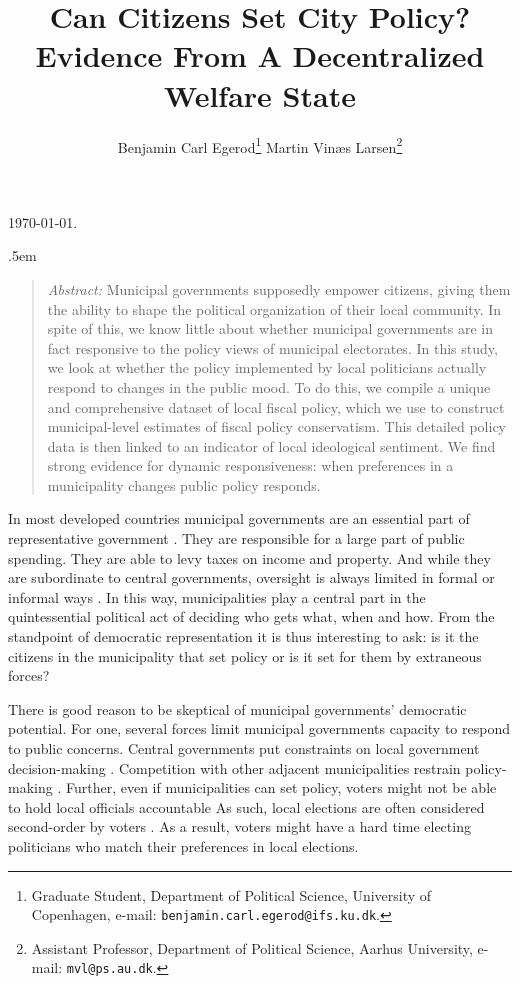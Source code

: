 \documentclass[a4paper,12pt]{article}
\title{\bigskip \bigskip \sffamily \LARGE{Can Citizens Set City Policy?} \\ \Large{ Evidence From A Decentralized Welfare State}}
\author{\bigskip Benjamin Carl Egerod\footnote[2]{Graduate Student, Department of Political Science, University of Copenhagen, e-mail: \texttt{benjamin.carl.egerod@ifs.ku.dk}.} \qquad Martin Vinæs Larsen\footnote[3]{Assistant Professor, Department of Political Science, Aarhus University, e-mail: \texttt{mvl@ps.au.dk}.}}
\makeatletter
\renewcommand{\maketitle}{
	\begin{flushleft}
		
		\onehalfspacing
		
		\@title
		
		\lineskip .5em
		\normalfont{\normalsize{\@author}}
\end{flushleft}}
\makeatother
\begin{document}
	
	\begin{footnotesize} \noindent \today. \end{footnotesize} %
	
	\vspace{0.7in}
	
	\maketitle
	
	\bigskip
	
	\begin{quotation} %

		\small \noindent \emph{Abstract:} Municipal governments supposedly empower citizens, giving them the ability to shape the political organization of their local community. In spite of this, we know little about whether municipal governments are in fact responsive to the policy views of municipal electorates. In this study, we look at whether the policy implemented by local politicians actually respond to changes in the public mood. To do this, we compile a unique and comprehensive dataset of local fiscal policy, which we use to construct municipal-level estimates of fiscal policy conservatism. This detailed policy data is then linked to an indicator of local ideological sentiment. We find strong evidence for dynamic responsiveness: when preferences in a municipality changes public policy responds.
	\end{quotation}



	
	\thispagestyle{empty} %
	
	
\clearpage


\noindent In most developed countries municipal governments are an essential part of representative government \citep{trounstine2009all,kersting2013reforming}. They are responsible for a large part of public spending.  They are able to levy taxes on income and property. And while they are subordinate to central governments, oversight is always limited in formal or informal ways \citep{oecd2016subnational}. In this way, municipalities play a central part in the quintessential political act of deciding who gets what, when and how. From the standpoint of democratic representation it is thus interesting to ask: is it the citizens in the municipality that set policy or is it set for them by extraneous forces?

There is good reason to be skeptical of municipal governments' democratic potential. For one,  several forces limit municipal governments capacity to respond to public concerns. Central governments put constraints on local government decision-making \citep{peterson1981city}. Competition with other adjacent municipalities restrain policy-making \citep{salmon2006horizontal,tiebout1956pure}. Further, even if municipalities can set policy, voters might not be able to hold local officials accountable\citep[e.g.,][]{sances2017attribution} As such, local elections are often considered second-order by voters \citep[e.g.,][]{marsh1998testing}. As a result, voters might have a hard time electing politicians who match their preferences in local elections. 
\end{document}
